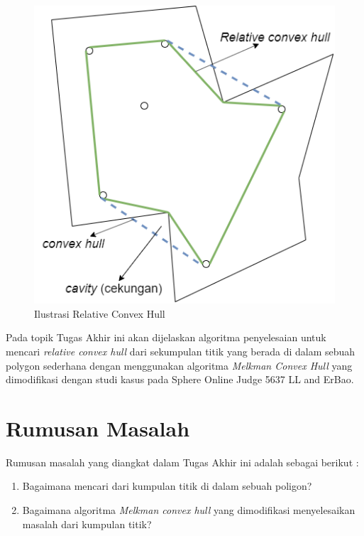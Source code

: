 \begin{figure}[!h]
	\Centering
	\includegraphics [width=0.5\columnwidth]{bab2/img/ilustrasi-relative-convex-hull}
	\caption {Ilustrasi Relative Convex Hull}
	\label {fig:ilustrasi-relative-convex-hull}
\end{figure}

\par Pada topik Tugas Akhir ini akan dijelaskan algoritma penyelesaian untuk mencari \textit{relative convex hull} dari sekumpulan titik yang berada di dalam sebuah polygon sederhana dengan menggunakan algoritma \textit{Melkman Convex Hull} yang dimodifikasi dengan studi kasus pada Sphere Online Judge 5637 LL and ErBao.

\section {Rumusan Masalah}

Rumusan masalah yang diangkat dalam Tugas Akhir ini adalah sebagai berikut :

\begin {enumerate}
    \item Bagaimana mencari \RCH dari kumpulan titik di dalam sebuah poligon?
    \item Bagaimana algoritma \textit{Melkman convex hull} yang dimodifikasi menyelesaikan masalah \RCH dari kumpulan titik?
\end {enumerate}

